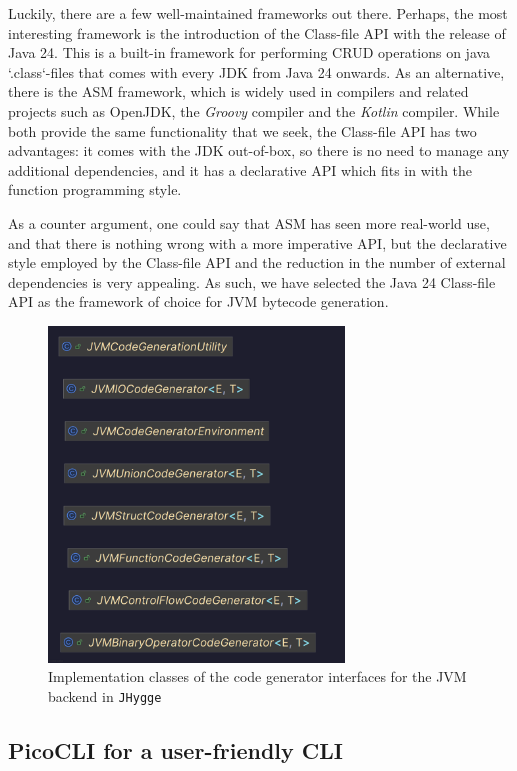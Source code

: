 Luckily, there are a few well-maintained frameworks out there. Perhaps, the most interesting framework is the introduction of the
Class-file API with the release of Java 24. This is a built-in framework for performing CRUD operations on java `.class`-files
that comes with every JDK from Java 24 onwards. As an alternative, there is the ASM framework, which is widely used in compilers
and related projects such as OpenJDK, the \textit{Groovy} compiler and the \textit{Kotlin} compiler. While both provide the
same functionality that we seek, the Class-file API has two advantages: it comes with the JDK out-of-box, so there is no
need to manage any additional dependencies, and it has a declarative API which fits in with the function programming style.

As a counter argument, one could say that ASM has seen more real-world use, and that there is nothing wrong with a more imperative
API, but the declarative style employed by the Class-file API and the reduction in the number of external dependencies is very
appealing. As such, we have selected the Java 24 Class-file API as the framework of choice for JVM bytecode generation.

\begin{figure}[H]
\centering
\includegraphics[width=0.7\textwidth]{Pictures/Diagrams/jvm_codegenerator_classes.png}
\caption{Implementation classes of the code generator interfaces for the JVM backend in \texttt{JHygge}}
\label{fig:jvm_codegenerator_classes}
\end{figure}

\subsection{PicoCLI for a user-friendly CLI}

